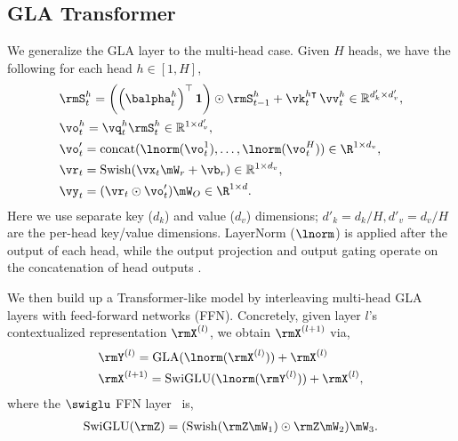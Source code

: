 \vspace{-2mm}
\subsection{GLA Transformer}
\vspace{-2mm}
\label{sec:gla-full}
We generalize the GLA layer to the multi-head case. Given $H$ heads, we have the following for each head $h \in [1, H]$,
\begin{align*}
    &\rmS^h_{t} =  \left( \left(\balpha_{t}^h\right)^{\top} \mathbf{1} \right)
    \odot \rmS_{t-1}^h + \vk_t^{h \intercal} \, \vv^h_t   \in \mathbb{R}^{d'_k \times d'_v}, \\  %
& \vo^h_{t} = \vq_t^{h}\rmS_t^h    \in \mathbb{R}^{1 \times d'_v}, \\ &
\vo'_t = \operatorname{concat}(\lnorm(\vo^1_t), \dots, \lnorm(\vo^H_t)) \in \R^{1 \times d_v}, 
  \\
 &\vr_t = \operatorname{Swish}(\vx_t \mW_r + \vb_r)  \in \mathbb{R}^{1 \times d_v}, 
 \\ & \vy_t = (\vr_t \odot \vo'_t) \mW_{O}  \in \R^{1 \times d}. 
\end{align*}
Here we use separate key ($d_k$) and value ($d_v$) dimensions; $d'_k = d_k / H, d'_v = d_v / H$ are the per-head key/value dimensions. LayerNorm ($\lnorm$) is applied after the output of each head, while the output projection and output gating operate on the concatenation of head outputs \cite{sun2023retentive}. 

We then build up a Transformer-like model by interleaving multi-head GLA layers with feed-forward networks (FFN). Concretely, given layer $l$'s contextualized representation $\rmX^{(l)}$, we obtain  $\rmX^{(l+1)}$ via,
\begin{align*}
   &\rmY^{(l)} = \operatorname{GLA}(\lnorm(\rmX^{(l)})) + \rmX^{(l)} \\ 
   & \rmX^{(l+1)} = \operatorname{SwiGLU}(\lnorm(\rmY^{(l)})) + \rmX^{(l)},
\end{align*}
where the $\swiglu$ FFN layer~\citep{touvron2023llama} is,
\begin{align*}
    \operatorname{SwiGLU}(\rmZ) = (\operatorname{Swish}(\rmZ \mW_1) \odot \rmZ \mW_2) \mW_{3}.
\end{align*}


